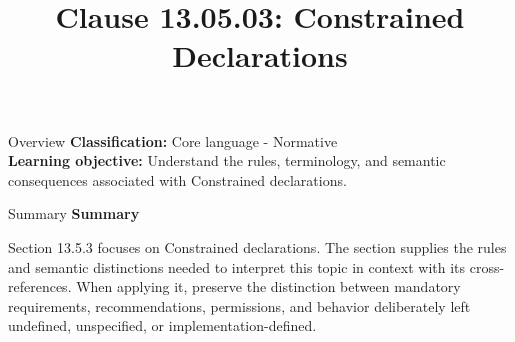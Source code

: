 \documentclass[10pt,letterpaper]{article}
\title{Clause 13.05.03: Constrained Declarations}
\author{}
\date{}
\begin{document}
\maketitle
\begin{CornellOverviewBox}{Overview}
\textbf{Classification:} Core language - Normative\\[2pt]
\textbf{Learning objective:} Understand the rules, terminology, and semantic consequences associated with Constrained declarations.
\end{CornellOverviewBox}\begin{CornellSummaryBox}{Summary}
{\sffamily\bfseries\color{Accent} Summary}\par\vspace{3pt}Section 13.5.3 focuses on Constrained declarations. The section supplies the rules and semantic distinctions needed to interpret this topic in context with its cross-references. When applying it, preserve the distinction between mandatory requirements, recommendations, permissions, and behavior deliberately left undefined, unspecified, or implementation-defined.
\end{CornellSummaryBox}
\end{document}
